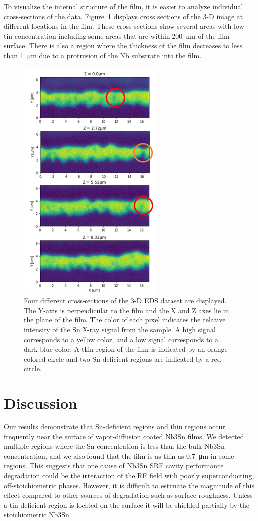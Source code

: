 To visualize the internal structure of the film, it is easier to analyze individual cross-sections of the data. Figure~\ref{fig:5} displays cross sections of the 3-D image at different locations in the film. These cross sections show several areas with low tin concentration including some areas that are within \qty{200}{\nano\meter} of the film surface. There is also a region where the thickness of the film decreases to less than \qty{1}{\micro\meter} due to a protrusion of the Nb substrate into the film.

\begin{figure}[htb]%
    \centering%
    \includegraphics[width=0.5\columnwidth]{../figs/Figure-5.png}%
    \caption{Four different cross-sections of the 3-D EDS dataset are displayed. The Y-axis is perpendicular to the film and the X and Z axes lie in the plane of the film. The color of each pixel indicates the relative intensity of the Sn X-ray signal from the sample. A high signal corresponds to a yellow color, and a low signal corresponds to a dark-blue color. A thin region of the film is indicated by an orange-colored circle and two Sn-deficient regions are indicated by a red circle.}%
    \label{fig:5}%
\end{figure}

 
\section{Discussion}

Our results demonstrate that Sn-deficient regions and thin regions occur frequently near the surface of vapor-diffusion coated Nb3Sn films. We detected multiple regions where the Sn-concentration is less than the bulk Nb3Sn concentration, and we also found that the film is as thin as \qty{0.7}{\micro\meter} in some regions. This suggests that one cause of Nb3Sn SRF cavity performance degradation could be the interaction of the RF field with poorly superconducting, off-stoichiometric phases. However, it is difficult to estimate the magnitude of this effect compared to other sources of degradation such as surface roughness. Unless a tin-deficient region is located on the surface it will be shielded partially by the stoichiometric Nb3Sn. 

